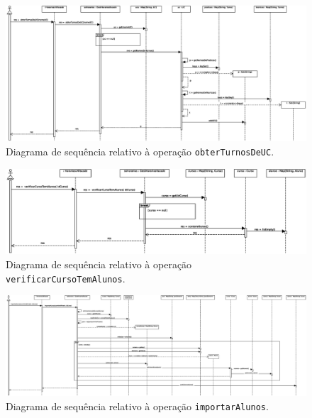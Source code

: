 \documentclass[12pt, a4paper]{article}
\begin{document}
\begin{landscape}
        \begin{figure}[H]
            \centering
            \includegraphics[scale=0.60]{Imagens/Modelos/obterTurnosDeUC.svg.eps}
            \caption{
                Diagrama de sequência relativo à operação \texttt{obterTurnosDeUC}.
            }
        \end{figure}

        \vspace*{\fill}
        \pagebreak
        \vspace*{\fill}

        \begin{figure}[H]
            \centering
            \includegraphics[scale=0.75]{Imagens/Modelos/verificarCursoTemAlunos.svg.eps}
            \caption{
                Diagrama de sequência relativo à operação \texttt{verificarCursoTemAlunos}.
            }
        \end{figure}

        \vspace*{\fill}
        \pagebreak
        \vspace*{\fill}

        \begin{figure}[H]
            \centering
            \includegraphics[scale=0.40]{Imagens/Modelos/importarAlunos.svg.eps}
            \caption{
                Diagrama de sequência relativo à operação \texttt{importarAlunos}.
            }
        \end{figure}


\end{landscape}
\end{document}
